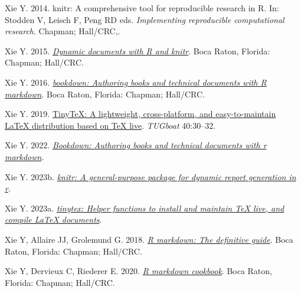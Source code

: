 \documentclass[10pt,a4paper]{article}
\newlength{\cslhangindent}
\newenvironment{CSLReferences}[2] %
 {\begin{list}{}{%
  \setlength{\itemindent}{0pt}
  \setlength{\leftmargin}{0pt}
  \setlength{\parsep}{0pt}
  \ifodd #1
   \setlength{\leftmargin}{\cslhangindent}
   \setlength{\itemindent}{-1\cslhangindent}
  \fi
  \setlength{\itemsep}{#2\baselineskip}}}
 {\end{list}}
\begin{document}
\begin{CSLReferences}{1}{0}
Xie Y. 2014. {knitr}: A comprehensive tool for reproducible research in {R}. In: Stodden V, Leisch F, Peng RD eds. \emph{Implementing reproducible computational research}. Chapman; Hall/CRC,.

Xie Y. 2015. \emph{\href{https://yihui.org/knitr/}{Dynamic documents with {R} and knitr}}. Boca Raton, Florida: Chapman; Hall/CRC.

Xie Y. 2016. \emph{\href{https://bookdown.org/yihui/bookdown}{{bookdown}: Authoring books and technical documents with {R} markdown}}. Boca Raton, Florida: Chapman; Hall/CRC.

Xie Y. 2019. \href{https://tug.org/TUGboat/Contents/contents40-1.html}{{TinyTeX}: A lightweight, cross-platform, and easy-to-maintain LaTeX distribution based on TeX live}. \emph{TUGboat} 40:30--32.

Xie Y. 2022. \emph{\href{https://CRAN.R-project.org/package=bookdown}{Bookdown: Authoring books and technical documents with r markdown}}.

Xie Y. 2023b. \emph{\href{https://yihui.org/knitr/}{{knitr}: A general-purpose package for dynamic report generation in r}}.

Xie Y. 2023a. \emph{\href{https://github.com/rstudio/tinytex}{{tinytex}: Helper functions to install and maintain TeX live, and compile LaTeX documents}}.

Xie Y, Allaire JJ, Grolemund G. 2018. \emph{\href{https://bookdown.org/yihui/rmarkdown}{R markdown: The definitive guide}}. Boca Raton, Florida: Chapman; Hall/CRC.

Xie Y, Dervieux C, Riederer E. 2020. \emph{\href{https://bookdown.org/yihui/rmarkdown-cookbook}{R markdown cookbook}}. Boca Raton, Florida: Chapman; Hall/CRC.

\end{CSLReferences}
\end{document}
